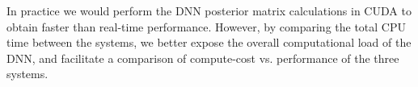 \documentclass{article}
\begin{document}
In practice we would perform the DNN posterior matrix calculations in
CUDA to obtain faster than real-time performance.
However, by comparing the total CPU time between the systems, we
better expose the overall computational load of the DNN, and facilitate
a comparison of compute-cost vs. performance of the three systems. 




%
\end{document}
